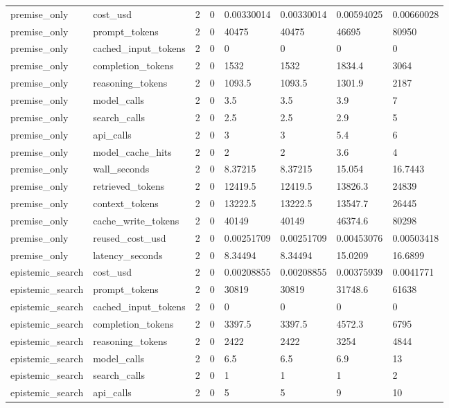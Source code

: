 \begin{tabular}{llllllll}
premise\_only & cost\_usd & 2 & 0 & 0.00330014 & 0.00330014 & 0.00594025 & 0.00660028 \\
premise\_only & prompt\_tokens & 2 & 0 & 40475 & 40475 & 46695 & 80950 \\
premise\_only & cached\_input\_tokens & 2 & 0 & 0 & 0 & 0 & 0 \\
premise\_only & completion\_tokens & 2 & 0 & 1532 & 1532 & 1834.4 & 3064 \\
premise\_only & reasoning\_tokens & 2 & 0 & 1093.5 & 1093.5 & 1301.9 & 2187 \\
premise\_only & model\_calls & 2 & 0 & 3.5 & 3.5 & 3.9 & 7 \\
premise\_only & search\_calls & 2 & 0 & 2.5 & 2.5 & 2.9 & 5 \\
premise\_only & api\_calls & 2 & 0 & 3 & 3 & 5.4 & 6 \\
premise\_only & model\_cache\_hits & 2 & 0 & 2 & 2 & 3.6 & 4 \\
premise\_only & wall\_seconds & 2 & 0 & 8.37215 & 8.37215 & 15.054 & 16.7443 \\
premise\_only & retrieved\_tokens & 2 & 0 & 12419.5 & 12419.5 & 13826.3 & 24839 \\
premise\_only & context\_tokens & 2 & 0 & 13222.5 & 13222.5 & 13547.7 & 26445 \\
premise\_only & cache\_write\_tokens & 2 & 0 & 40149 & 40149 & 46374.6 & 80298 \\
premise\_only & reused\_cost\_usd & 2 & 0 & 0.00251709 & 0.00251709 & 0.00453076 & 0.00503418 \\
premise\_only & latency\_seconds & 2 & 0 & 8.34494 & 8.34494 & 15.0209 & 16.6899 \\
epistemic\_search & cost\_usd & 2 & 0 & 0.00208855 & 0.00208855 & 0.00375939 & 0.0041771 \\
epistemic\_search & prompt\_tokens & 2 & 0 & 30819 & 30819 & 31748.6 & 61638 \\
epistemic\_search & cached\_input\_tokens & 2 & 0 & 0 & 0 & 0 & 0 \\
epistemic\_search & completion\_tokens & 2 & 0 & 3397.5 & 3397.5 & 4572.3 & 6795 \\
epistemic\_search & reasoning\_tokens & 2 & 0 & 2422 & 2422 & 3254 & 4844 \\
epistemic\_search & model\_calls & 2 & 0 & 6.5 & 6.5 & 6.9 & 13 \\
epistemic\_search & search\_calls & 2 & 0 & 1 & 1 & 1 & 2 \\
epistemic\_search & api\_calls & 2 & 0 & 5 & 5 & 9 & 10 \\

\end{tabular}
